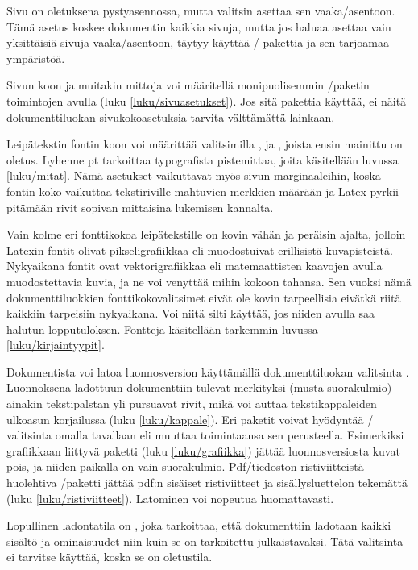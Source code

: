 Sivu on oletuksena pystyasennossa, mutta valitsin 
asettaa sen vaaka\-/asentoon. Tämä asetus koskee dokumentin kaikkia
sivuja, mutta jos haluaa asettaa vain yksittäisiä sivuja
vaaka\-/asentoon, täytyy käyttää \-/ pakettia ja
sen tarjoamaa ympäristöä.

Sivun koon ja muitakin mittoja voi määritellä monipuolisemmin
\-/paketin toimintojen avulla (luku
\ref{luku/sivuasetukset}). Jos sitä pakettia käyttää, ei näitä
dokumenttiluokan sivukokoasetuksia tarvita välttämättä lainkaan.

Leipätekstin fontin koon voi määrittää valitsimilla \koodi{10pt},
\koodi{11pt} ja \koodi{12pt}, joista ensin mainittu on oletus. Lyhenne
pt tarkoittaa typografista pistemittaa, joita käsitellään luvussa
\ref{luku/mitat}. Nämä asetukset vaikuttavat myös sivun marginaaleihin,
koska fontin koko vaikuttaa tekstiriville mahtuvien merkkien määrään ja
Latex pyrkii pitämään rivit sopivan mittaisina lukemisen kannalta.

Vain kolme eri fonttikokoa leipätekstille on kovin vähän ja peräisin
ajalta, jolloin Latexin fontit olivat pikseligrafiikkaa eli muodostuivat
erillisistä kuvapisteistä. Nykyaikana fontit ovat vektorigrafiikkaa eli
matemaattisten kaavojen avulla muodostettavia kuvia, ja ne voi venyttää
mihin kokoon tahansa. Sen vuoksi nämä dokumenttiluokkien
fonttikokovalitsimet eivät ole kovin tarpeellisia eivätkä riitä kaikkiin
tarpeisiin nykyaikana. Voi niitä silti käyttää, jos niiden avulla saa
halutun lopputuloksen. Fontteja käsitellään tarkemmin luvussa
\ref{luku/kirjaintyypit}.

Dokumentista voi latoa luonnosversion käyttämällä dokumenttiluokan
valitsinta . Luonnoksena ladottuun dokumenttiin tulevat
merkityksi (musta suorakulmio) ainakin tekstipalstan yli pursuavat
rivit, mikä voi auttaa tekstikappaleiden ulkoasun korjailussa (luku
\ref{luku/kappale}). Eri paketit voivat hyödyntää \-/
valitsinta omalla tavallaan eli muuttaa toimintaansa sen perusteella.
Esimerkiksi grafiikkaan liittyvä paketti  (luku
\ref{luku/grafiikka}) jättää luonnosversiosta kuvat pois, ja niiden
paikalla on vain suorakulmio. Pdf\-/tiedoston ristiviitteistä huolehtiva
\-/paketti jättää pdf:n sisäiset ristiviitteet ja
sisällysluettelon tekemättä (luku \ref{luku/ristiviitteet}). Latominen
voi nopeutua huomattavasti.

Lopullinen ladontatila on , joka tarkoittaa, että
dokumenttiin ladotaan kaikki sisältö ja ominaisuudet niin kuin se on
tarkoitettu julkaistavaksi. Tätä valitsinta ei tarvitse käyttää, koska
se on oletustila.

